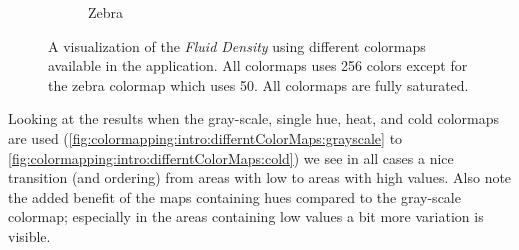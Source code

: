 \begin{figure}[htb]
\begin{subfigure}{0.35\textwidth}
		\caption{Zebra}
		\label{fig:colormapping:intro:differntColorMaps:zebra}
	\end{subfigure}
\caption{A visualization of the \emph{Fluid Density} using different colormaps available in the application. All colormaps uses 256 colors except for the zebra colormap which uses 50. All colormaps are fully saturated.}
\end{figure}


Looking at the results when the gray-scale, single hue, heat, and cold colormaps are used (\cref{fig:colormapping:intro:differntColorMaps:grayscale} to \ref{fig:colormapping:intro:differntColorMaps:cold}) we see in all cases a nice transition (and ordering) from areas with low to areas with high values. Also note the added benefit of the maps containing hues compared to the gray-scale colormap; especially in the areas containing low values a bit more variation is visible.

